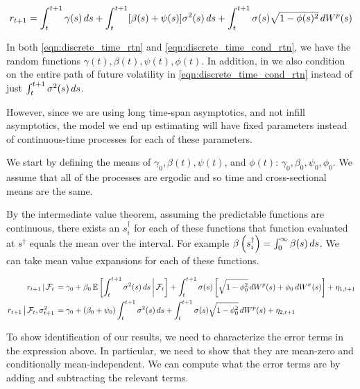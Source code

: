 \documentclass[11pt, letterpaper, twoside, final]{article}
\begin{document}
\begin{equation}
    \label{eqn:discrete_time_cond_rtn}
    r_{t+1} = \int_t^{t+1} \gamma(s) \mathop{}\!d s + \int_{t}^{t+1} [\beta(s) + \psi(s)] \sigma^2(s) \mathop{}\!d s +
    \int_t^{t+1} \sigma(s) \sqrt{1-\phi(s)^2} \mathop{}\!d W^{p}(s)
\end{equation}

In both \cref{eqn:discrete_time_rtn} and \cref{eqn:discrete_time_cond_rtn}, we have the random functions
$\gamma(t), \beta(t), \psi(t), \phi(t)$.
In addition, in we also condition on the entire path of future volatility in \cref{eqn:discrete_time_cond_rtn}
instead of just $\int_t^{t+1} \sigma^2(s) \mathop{}\!d s$.

However, since we are using long time-span asymptotics, and not infill asymptotics, the model we end up estimating
will have fixed parameters instead of continuous-time processes for each of these parameters.

We start by defining the means of $\gamma_0, \beta(t), \psi(t)$, and $\phi(t)$: $\gamma_0, \beta_0, \psi_0, \phi_0$.
We assume that all of the processes are ergodic and so time and cross-sectional means are the same.

By the intermediate value theorem, assuming the predictable functions are continuous, there exists an
$s_i^{\dagger}$ for each of these functions that function evaluated at $s^{\dagger}$ equals the mean over the
interval.
For example $\beta\left(s_i^{\dagger}\right) = \int_0^{\infty} \beta(s) \mathop{}\!d s$.  
We can take mean value expansions for each of these functions.

\begin{alignat}{1}
    \label{eqn:price_decomp}
    \left. r_{t+1} \,\middle\vert\, \mathcal{F}_t \right. 
    &= \gamma_0 + \beta_0 \operatorname{\mathbb{E}}\left[\int_t^{t+1} \sigma^2(s) \mathop{}\!d s \,\middle\vert\, \mathcal{F}_t\right] + \int_t^{t+1} \sigma(s)
       \left[\sqrt{1 - \phi_0^2} \mathop{}\!d W^{p}(s) + \phi_0 \mathop{}\!d W^{\sigma}(s)\right] + \eta_{1,t+1} \\
    \left. r_{t+1} \,\middle\vert\, \mathcal{F}_t, \sigma^2_{t+1} \right. 
    &= \gamma_0 + (\beta_0 + \psi_0) \int_t^{t+1} \sigma^2(s) \mathop{}\!d s + \int_t^{t+1} \sigma(s) \sqrt{1-\phi_0^2}
       \mathop{}\!d W^{p}(s) + \eta_{2, t+1} 
\end{alignat}

To show identification of our results, we need to characterize the error terms in the expression above.
In particular, we need to show that they are mean-zero and conditionally mean-independent.
We can compute what the error terms are by adding and subtracting the relevant terms.
\end{document}
